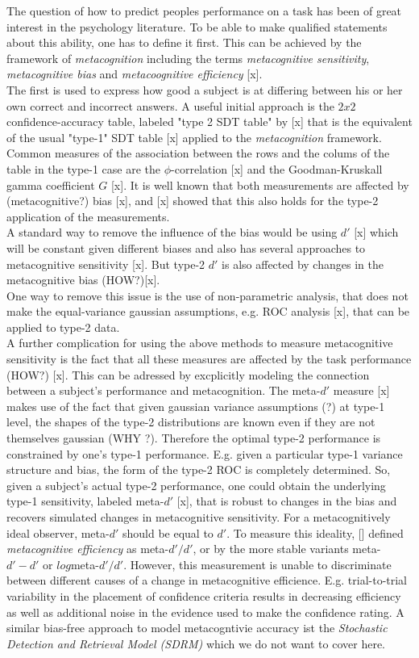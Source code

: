\documentclass[../main/main.tex]{subfiles}
\begin{document}
	The question of how to predict peoples performance on a task has been of great interest in the psychology literature. To be able to make qualified statements about this ability, one has to define it first.
	This can be achieved by the framework of \textit{metacognition} including the terms \textit{metacognitive sensitivity}, \textit{metacognitive bias} and \textit{metacoognitive efficiency} [x].\\
	The first is used to express how good a subject is at differing between his or her own correct and incorrect answers. A useful initial approach is the $2x2$ confidence-accuracy table, labeled "type 2 SDT table" by [x] that is the equivalent of the usual "type-1" SDT table [x] applied to the \textit{metacognition} framework. Common measures of the association between the rows and the colums of the table in the type-1 case are the $\phi$-correlation [x] and the Goodman-Kruskall gamma coefficient $G$ [x]. It is well known that both measurements are affected by (metacognitive?) bias [x], and [x] showed that this also holds for the type-2 application of the measurements.\\
	A standard way to remove the influence of the bias would be using $d'$ [x] which will be constant given different biases and also has several approaches to metacognitive sensitivity [x]. But type-2 $d'$ is also affected by changes in the metacognitive bias (HOW?)[x].\\
	One way to remove this issue is the use of non-parametric analysis, that does not make the equal-variance gaussian assumptions, e.g. ROC analysis [x], that can be applied to type-2 data.\\
	A further complication for using the above methods to measure metacognitive sensitivity is the fact that all these measures are affected by the task performance (HOW?) [x]. This can be adressed by excplicitly modeling the connection between a subject's performance and metacognition. The meta-$d'$ measure [x] makes use of the fact that given gaussian variance assumptions (?) at type-1 level, the shapes of the type-2 distributions are known even if they are not themselves gaussian (WHY ?). Therefore the optimal type-2 performance is constrained by one's type-1 performance. E.g. given a particular type-1 variance structure and bias, the form of the type-2 ROC is completely determined. So, given a subject's actual type-2 performance, one could obtain the underlying type-1 sensitivity, labeled meta-$d'$ [x], that is robust to changes in the bias and recovers simulated changes in metacognitive sensitivity. For a metacognitively ideal observer, meta-$d'$ should be equal to $d'$. To measure this ideality, [] defined \textit{metacognitive efficiency} as meta-$d'/d'$, or by the more stable variants meta-$d'-d'$ or $log$meta-$d'/d'$. However, this measurement is unable to discriminate between different causes of a change in metacognitive efficience. E.g. trial-to-trial variability in the placement of confidence criteria results in decreasing efficiency as well as additional noise in the evidence used to make the confidence rating. A similar bias-free approach to model metacogntivie accuracy ist the \textit{Stochastic Detection and Retrieval Model (SDRM)} which we do not want to cover here.\\
\end{document}
